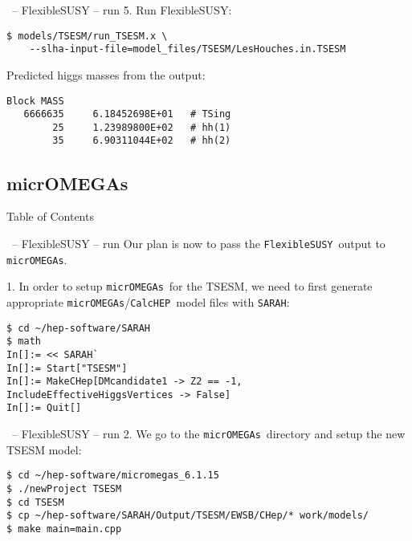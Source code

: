 \documentclass[11pt]{beamer}
\newcommand{\CalcHEP}{\texttt{CalcHEP}}
\newcommand{\FlexibleSUSY}{\texttt{FlexibleSUSY}}
\newcommand{\micrOMEGAs}{\texttt{micrOMEGAs}}
\newcommand{\SARAH}{\texttt{SARAH}}
\begin{document}
\begin{frame}[fragile]{\insertsection\ -- FlexibleSUSY -- run}
  5. Run FlexibleSUSY:
  \begin{lstlisting}
$ models/TSESM/run_TSESM.x \
    --slha-input-file=model_files/TSESM/LesHouches.in.TSESM\end{lstlisting}%
  Predicted higgs masses from the output:
  \begin{lstlisting}
Block MASS
   6666635     6.18452698E+01   # TSing
        25     1.23989800E+02   # hh(1)
        35     6.90311044E+02   # hh(2)\end{lstlisting}
\end{frame}


\subsection{micrOMEGAs}


\begin{frame}{Table of Contents}
\end{frame}


\begin{frame}[fragile]{\insertsection\ -- FlexibleSUSY -- run}
  Our plan is now to pass the \FlexibleSUSY\ output to \micrOMEGAs.

  \medskip

  1. In order to setup \micrOMEGAs\ for the TSESM, we need to first
  generate appropriate \micrOMEGAs/\CalcHEP\ model files with \SARAH:
  \begin{lstlisting}
$ cd ~/hep-software/SARAH
$ math
In[]:= << SARAH`
In[]:= Start["TSESM"]
In[]:= MakeCHep[DMcandidate1 -> Z2 == -1, IncludeEffectiveHiggsVertices -> False]
In[]:= Quit[]\end{lstlisting}%
\end{frame}


\begin{frame}[fragile]{\insertsection\ -- FlexibleSUSY -- run}
  2. We go to the \micrOMEGAs\ directory and setup the new TSESM
  model:
  \begin{lstlisting}
$ cd ~/hep-software/micromegas_6.1.15
$ ./newProject TSESM
$ cd TSESM
$ cp ~/hep-software/SARAH/Output/TSESM/EWSB/CHep/* work/models/
$ make main=main.cpp\end{lstlisting}%
\end{frame}
\end{document}
